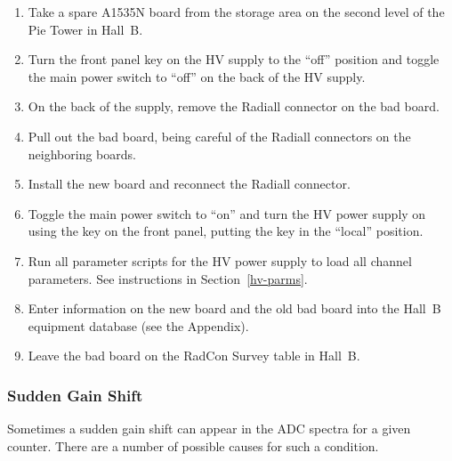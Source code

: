 \documentclass[letterpaper,10pt]{article}
\begin{document}
\begin{enumerate}
\item Take a spare A1535N board from the storage area on the second level of the Pie Tower in Hall~B.
\item Turn the front panel key on the HV supply to the ``off'' position and toggle the main power 
switch to ``off'' on the back of the HV supply.
\item On the back of the supply, remove the Radiall connector on the bad board.
\item Pull out the bad board, being careful of the Radiall connectors on the neighboring boards.
\item Install the new board and reconnect the Radiall connector.
\item Toggle the main power switch to ``on'' and turn the HV power supply on using the key on the front 
panel, putting the key in the ``local'' position.
\item Run all parameter scripts for the HV power supply to load all channel parameters. See instructions
in Section~\ref{hv-parms}.
\item Enter information on the new board and the old bad board into the Hall~B equipment database (see
the Appendix).
\item Leave the bad board on the RadCon Survey table in Hall~B.
\end{enumerate}

\subsubsection{Sudden Gain Shift}
\label{gain-shift}

Sometimes a sudden gain shift can appear in the ADC spectra for a given counter. There are a number of
possible causes for such a condition.
\end{document}
